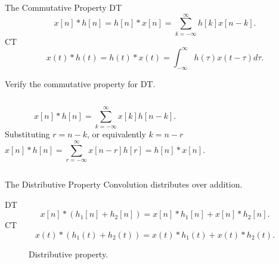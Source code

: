 \begin{frame}{The Commutative Property}
    DT
    \begin{equation*}
        x[n]\ast h[n] = h[n] \ast x[n] = \sum_{k=-\infty}^{\infty}h[k]x[n-k].
    \end{equation*}
    CT
    \begin{equation*}
        x(t)\ast h(t) = h(t) \ast x(t) = \int_{-\infty}^{\infty}h(\tau)x(t-\tau)d\tau.
    \end{equation*}

    Verify the commutative property for DT.
    \pause
    {
        \begin{columns}
                \begin{equation*}
                    x[n]\ast h[n] = \sum_{k=-\infty}^{\infty}x[k]h[n-k].
                \end{equation*}
                Substituting $r = n-k$, or equivalently $k = n-r$
                \pause
                \begin{equation*}
                    x[n]\ast h[n] = \sum_{r=-\infty}^{\infty}x[n-r]h[r] = h[n]\ast x[n].
                \end{equation*}
        \end{columns}
    }
\end{frame}

\begin{frame}{The Distributive Property}
Convolution distributes over addition.\par
    DT
    \begin{equation*}
        x[n]\ast (h_1[n] + h_2[n]) = x[n]\ast h_1[n] + x[n]\ast  h_2[n].
    \end{equation*}
    CT
    \begin{equation*}
        x(t)\ast (h_1(t) + h_2(t)) = x(t)\ast h_1(t) + x(t)\ast  h_2(t).
    \end{equation*}


    {
        \begin{figure}
          \centering
          
          \caption{Distributive property.}\label{fi:distributive_property}
        \end{figure}
    }
\end{frame}



